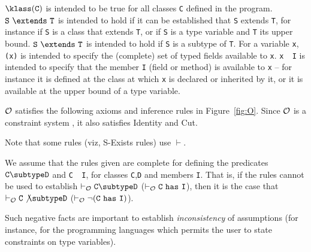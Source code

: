 $\klass({\tt C})$ is intended to be true for all classes {\tt C}
defined in the program. ${\tt S}\ \extends\ {\tt T}$ is intended to
hold if it can be established that {\tt S} extends {\tt T}, for
instance if {\tt S} is a class that extends {\tt T}, or if {\tt S} is
a type variable and {\tt T} its upper bound. ${\tt S}\ \extends\ {\tt
T}$ is intended to hold if {\tt S} is a subtype of {\tt T}.  For a
variable {\tt x}, {\tt \fields({\tt x})} is intended to specify the
(complete) set of typed fields available to {\tt x}.  {\tt x\ \has\ I}
is intended to specify that the member {\tt I} (field or method) is
available to {\tt x} -- for instance it is defined at the class at
which {\tt x} is declared or inherited by it, or it is available at
the upper bound of a type variable.


$\cal O$ satisfies the following axioms and inference rules in
Figure~\ref{fig:O}. Since $\cal O$ is a constraint system \cite{CCCC},
it also satisfies Identity and Cut.

 Note that some rules (viz, {\sc S-Exists} rules)
use $\vdash$. 


We assume that the rules given are complete for
defining the predicates $\tt C \subtype D$ and {\tt C\ \has\ I}, for
classes {\tt C},{\tt D} and members {\tt I}. That is, if the rules
cannot be used to establish $\tt \vdash_{\cal O} C \subtype D$ ($\tt
\vdash_{\cal O} C\ \has\ I$), then it is the case that $\tt
\vdash_{\cal O} C \not\subtype D$ ($\tt \vdash_{\cal O} \neg (C\ \has\
I)$).

Such negative facts are important to establish {\em inconsistency} of
assumptions (for instance, for the programming languages which permits
the user to state constraints on type variables).  

